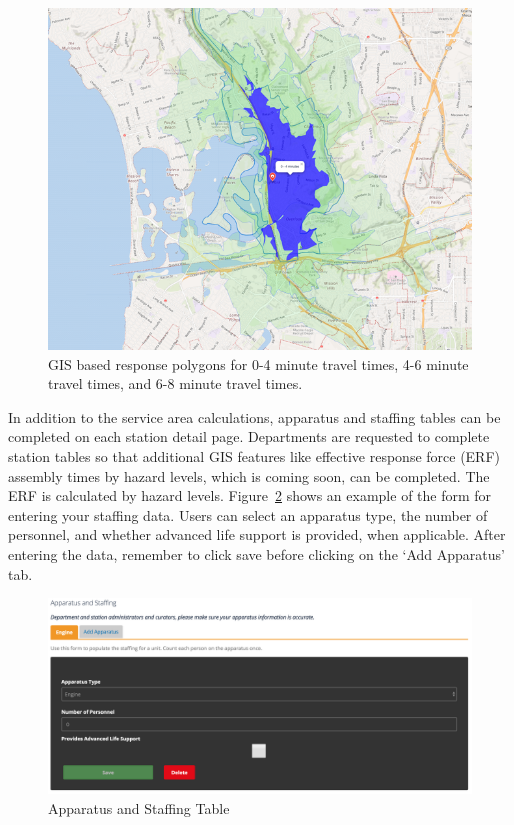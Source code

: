 \documentclass[12pt,oneside]{book}
\begin{document}
\begin{figure}[ht!]
\centering
\includegraphics[width=.9\columnwidth]{Figures/response_area}
\caption{GIS based response polygons for 0-4 minute travel times, 4-6 minute travel times, and 6-8 minute travel times.}
\label{fig:response_area}
\end{figure}

In addition to the service area calculations, apparatus and staffing tables can be completed on each station detail page. Departments are requested to complete station tables so that additional GIS features like effective response force (ERF) assembly times by hazard levels, which is coming soon, can be completed. The ERF is calculated by hazard levels. Figure~\ref{fig:staffing} shows an example of the form for entering your staffing data. Users can select an apparatus type, the number of personnel, and whether advanced life support is provided, when applicable. After entering the data, remember to click save before clicking on the `Add Apparatus' tab.

\begin{figure}[ht!]
\centering
\includegraphics[width=.9\columnwidth]{Figures/staffing}
\caption{Apparatus and Staffing Table}
\label{fig:staffing}
\end{figure}
\end{document}
